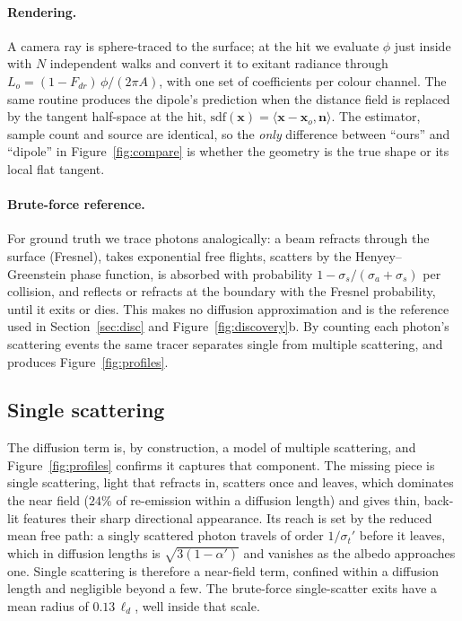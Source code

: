 \documentclass[11pt]{article}
\providecommand{\RSingleNear}{0}
\renewcommand{\RSingleNear}{24}
\newcommand{\sa}{\sigma_a}
\newcommand{\sgs}{\sigma_s}
\newcommand{\stp}{\sigma_t'}
\newcommand{\ld}{\ell_d}
\begin{document}
\paragraph{Rendering.}
A camera ray is sphere-traced to the surface; at the hit we evaluate
$\phi$ just inside with $N$ independent walks and convert it to exitant radiance
through $L_o=(1-F_{dr})\,\phi/(2\pi A)$, with one set of coefficients per colour
channel. The same routine produces the dipole's prediction when the distance
field is replaced by the tangent half-space at the hit, $\mathrm{sdf}(\mathbf{x})
=\langle\mathbf{x}-\mathbf{x}_o,\mathbf{n}\rangle$. The estimator, sample count
and source are identical, so the \emph{only} difference between ``ours'' and
``dipole'' in Figure~\ref{fig:compare} is whether the geometry is the true shape or its local flat tangent.

\paragraph{Brute-force reference.}
For ground truth we trace photons analogically: a beam refracts through the
surface (Fresnel), takes exponential free flights, scatters by the
Henyey--Greenstein phase function, is absorbed with probability $1-\sgs/(\sa+\sgs)$
per collision, and reflects or refracts at the boundary with the Fresnel
probability, until it exits or dies. This makes no diffusion approximation and is
the reference used in Section~\ref{sec:disc} and Figure~\ref{fig:discovery}b. By
counting each photon's scattering events the same tracer separates single from
multiple scattering, and produces Figure~\ref{fig:profiles}.

\subsection{Single scattering}
\label{sec:single}
The diffusion term is, by construction, a model of multiple scattering, and
Figure~\ref{fig:profiles} confirms it captures that component. The missing piece
is single scattering, light that refracts in, scatters once and leaves,
which dominates the near field ($\RSingleNear\%$ of re-emission within a diffusion
length) and gives thin, back-lit features their sharp directional appearance. Its reach
is set by the reduced mean free path: a singly scattered photon travels of order
$1/\stp$ before it leaves, which in diffusion lengths is $\sqrt{3(1-\alpha')}$ and
vanishes as the albedo approaches one. Single scattering is therefore a near-field term, confined within a diffusion length and negligible beyond a few. The brute-force single-scatter exits have a mean radius of $0.13\,\ld$, well inside that scale.
\end{document}
